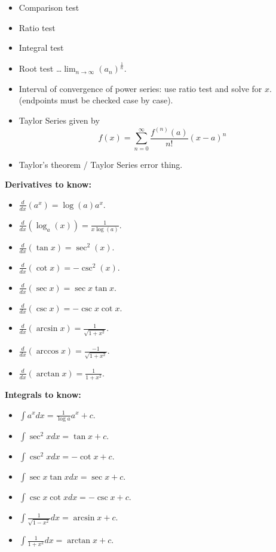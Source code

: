 \documentclass[12pt]{amsart}
\newcommand{\deriv}[2]{\frac{d#1}{d#2}}
\begin{document}
\begin{multicols}{2}
\begin{itemize}
    \item Comparison test
    \item Ratio test
    \item Integral test
    \item Root test \dots $\lim_{n\to\infty}(a_n)^{ \frac{1}{n}}$.
    \item Interval of convergence of power series: use ratio test and solve for $x$. (endpoints must be checked case by case).
    \item Taylor Series given by
        \begin{equation}
        f(x) = \sum_{n=0}^\infty \frac{f^{(n)}(a)}{n!}{(x-a)}^n 
        \end{equation}
    \item Taylor's theorem / Taylor Series error thing.
\end{itemize}
\textbf{Derivatives to know:}
\begin{itemize}
    \item $\deriv{}{x}(a^x) = \log(a)a^x$.
    \item $\deriv{}{x}(\log_a(x)) = \frac{1}{x\log(a)}$.
    \item $\deriv{}{x}(\tan x) = \sec^2(x)$.
    \item $\deriv{}{x}(\cot x) = -\csc^2(x)$.
    \item $\deriv{}{x}(\sec x) = \sec x \tan x$.
    \item $\deriv{}{x}(\csc x) = -\csc x \cot x$.
    \item $\deriv{}{x}(\arcsin x) = \frac{1}{\sqrt{1+x^2}}$.
    \item $\deriv{}{x}(\arccos x) = \frac{-1}{\sqrt{1+x^2}}$.
    \item $\deriv{}{x}(\arctan x) = \frac{1}{1+x^2}$.
\end{itemize}
\textbf{Integrals to know:}
\begin{itemize}
    \item $\int a^x dx = \frac{1}{\log a} a^x + c$.
    \item $\int \sec^2 x dx = \tan x + c$.
    \item $\int \csc^2 x dx = -\cot x + c$.
    \item $\int \sec x \tan x dx = \sec x + c$.
    \item $\int \csc x \cot x dx = -\csc x + c$.
    \item $\int \frac{1}{\sqrt{1-x^2}} dx = \arcsin x + c$.
    \item $\int \frac{1}{1+x^2} dx = \arctan x + c$.
\end{itemize}

\end{multicols}
\end{document}
